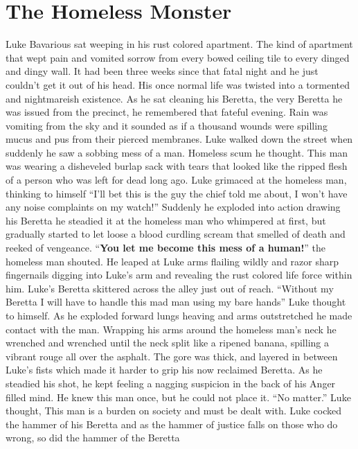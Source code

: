 \chapter{The Homeless Monster}





Luke Bavarious sat weeping in his rust colored apartment. The kind of
apartment that wept pain and vomited sorrow from every bowed ceiling
tile to every dinged and dingy wall. It had been three weeks since that
fatal night and he just couldn't get it out of his head. His once normal
life was twisted into a tormented and nightmareish existence. As he sat
cleaning his Beretta, the very Beretta he was issued from the precinct,
he remembered that fateful evening. Rain was vomiting from the sky and
it sounded as if a thousand wounds were spilling mucus and pus from
their pierced membranes. Luke walked down the street when suddenly he
saw a sobbing mess of a man. Homeless scum he thought. This man was
wearing a disheveled burlap sack with tears that looked like the ripped
flesh of a person who was left for dead long ago. Luke grimaced at the
homeless man, thinking to himself ``I'll bet this is the guy the chief
told me about, I won't have any noise complaints on my watch!'' Suddenly
he exploded into action drawing his Beretta he steadied it at the
homeless man who whimpered at first, but gradually started to let loose
a blood curdling scream that smelled of death and reeked of vengeance.
``{\bf You let me become this mess of a human!}'' the homeless man
shouted. He leaped at Luke arms flailing wildly and razor sharp
fingernails digging into Luke's arm and revealing the rust colored life
force within him. Luke's Beretta skittered across the alley just out of
reach. ``Without my Beretta I will have to handle this mad man using my
bare hands'' Luke thought to himself. As he exploded forward lungs
heaving and arms outstretched he made contact with the man. Wrapping his
arms around the homeless man's neck he wrenched and wrenched until the
neck split like a ripened banana, spilling a vibrant rouge all over the
asphalt. The gore was thick, and layered in between Luke's fists which
made it harder to grip his now reclaimed Beretta. As he steadied his
shot, he kept feeling a nagging suspicion in the back of his Anger
filled mind. He knew this man once, but he could not place it. ``No
matter.'' Luke thought, This man is a burden on society and must be
dealt with.  Luke cocked the hammer of his Beretta and as the hammer of
justice falls on those who do wrong, so did the hammer of the Beretta
